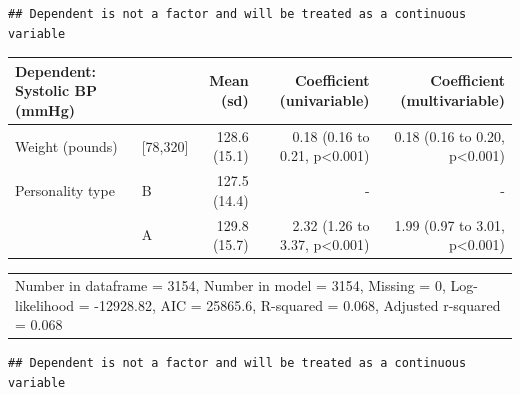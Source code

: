 \documentclass[12pt,]{krantz}
\makeatletter
\newenvironment{Shaded}{\begin{snugshade}}{\end{snugshade}}
\newcommand{\DataTypeTok}[1]{\textcolor[rgb]{0.13,0.29,0.53}{#1}}
\newcommand{\KeywordTok}[1]{\textcolor[rgb]{0.13,0.29,0.53}{\textbf{#1}}}
\newcommand{\NormalTok}[1]{#1}
\newcommand{\OperatorTok}[1]{\textcolor[rgb]{0.81,0.36,0.00}{\textbf{#1}}}
\newcommand{\OtherTok}[1]{\textcolor[rgb]{0.56,0.35,0.01}{#1}}
\newcommand{\StringTok}[1]{\textcolor[rgb]{0.31,0.60,0.02}{#1}}
\newenvironment{kframe}{%
\medskip{}
\setlength{\fboxsep}{.8em}
 \def\at@end@of@kframe{}%
 \ifinner\ifhmode%
  \def\at@end@of@kframe{\end{minipage}}%
  \begin{minipage}{\columnwidth}%
 \fi\fi%
 \def\FrameCommand##1{\hskip\@totalleftmargin \hskip-\fboxsep
 \colorbox{shadecolor}{##1}\hskip-\fboxsep
     \hskip-\linewidth \hskip-\@totalleftmargin \hskip\columnwidth}%
 \MakeFramed {\advance\hsize-\width
   \@totalleftmargin\z@ \linewidth\hsize
   \@setminipage}}%
 {\par\unskip\endMakeFramed%
 \at@end@of@kframe}
\renewenvironment{Shaded}{\begin{kframe}}{\end{kframe}}
\theoremstyle{definition}
\theoremstyle{definition}
\theoremstyle{definition}
\theoremstyle{remark}
\makeatother
\begin{document}
\begin{verbatim}
## Dependent is not a factor and will be treated as a continuous variable
\end{verbatim}

\begin{tabular}{llrrr}
\toprule
Dependent: Systolic BP (mmHg) &  & Mean (sd) & Coefficient (univariable) & Coefficient (multivariable)\\
\midrule
Weight (pounds) & [78,320] & 128.6 (15.1) & 0.18 (0.16 to 0.21, p<0.001) & 0.18 (0.16 to 0.20, p<0.001)\\
Personality type & B & 127.5 (14.4) & - & -\\
 & A & 129.8 (15.7) & 2.32 (1.26 to 3.37, p<0.001) & 1.99 (0.97 to 3.01, p<0.001)\\
\bottomrule
\end{tabular}

\begin{tabular}{l}
\toprule
\\
\midrule
Number in dataframe = 3154, Number in model = 3154, Missing = 0, Log-likelihood = -12928.82, AIC = 25865.6, R-squared = 0.068, Adjusted r-squared = 0.068\\
\bottomrule
\end{tabular}

\begin{Shaded}
\end{Shaded}

\begin{verbatim}
## Dependent is not a factor and will be treated as a continuous variable
\end{verbatim}
\end{document}
